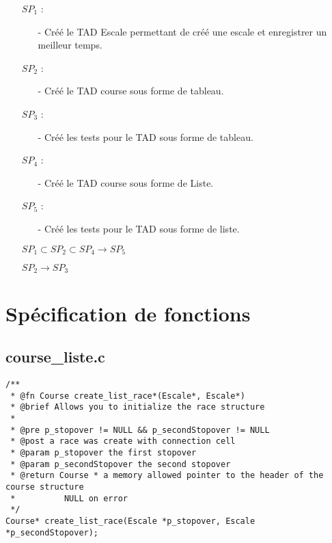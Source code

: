 \documentclass[a4paper, 11pt, oneside]{article}
\begin{document}
	\begin{itemize}
		\item[] $SP_1$ :
		\begin{itemize}
			\item[-] Créé le TAD Escale permettant de créé une escale et enregistrer un meilleur temps.
		\end{itemize}
		\item[] $SP_2$ :
		\begin{itemize}
			\item[-] Créé le TAD course sous forme de tableau.
		\end{itemize}
		\item[] $SP_3$ :
		\begin{itemize}
			\item[-] Créé les tests pour le TAD sous forme de tableau.
		\end{itemize}
		\item[] $SP_4$ :
		\begin{itemize}
			\item[-] Créé le TAD course sous forme de Liste.
		\end{itemize}
		\item[] $SP_5$ :
		\begin{itemize}
			\item[-] Créé les tests pour le TAD sous forme de liste.
		\end{itemize}
	\end{itemize}

	\vspace{5mm}

	\begin{itemize}
		\item[] $SP_1 \subset SP_2 \subset SP_4 \rightarrow SP_5$
		\item[] $SP_2 \rightarrow SP_3$
	\end{itemize}

\newpage

\section{Spécification de fonctions}

	\subsection{course\_liste.c}

		\begin{lstlisting}
/**
 * @fn Course create_list_race*(Escale*, Escale*)
 * @brief Allows you to initialize the race structure
 *
 * @pre p_stopover != NULL && p_secondStopover != NULL
 * @post a race was create with connection cell
 * @param p_stopover the first stopover
 * @param p_secondStopover the second stopover
 * @return Course * a memory allowed pointer to the header of the course structure
 * 			NULL on error
 */
Course* create_list_race(Escale *p_stopover, Escale *p_secondStopover);
		\end{lstlisting}
\end{document}
